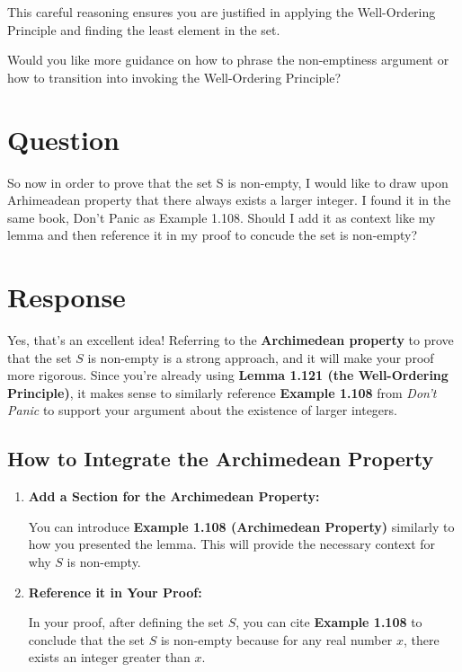 \documentclass{article}
\begin{document}
This careful reasoning ensures you are justified in applying the Well-Ordering Principle and finding the least element in the set.

Would you like more guidance on how to phrase the non-emptiness argument or how to transition into invoking the Well-Ordering Principle?

\section*{Question}

So now in order to prove that the set S is non-empty, I would like to draw upon Arhimeadean property that there always exists a larger integer. I found it in the same book, Don't Panic as Example 1.108. Should I add it as context like my lemma and then reference it in my proof to concude the set is non-empty?

\section*{Response}

Yes, that's an excellent idea! Referring to the \textbf{Archimedean property} to prove that the set \( S \) is non-empty is a strong approach, and it will make your proof more rigorous. Since you're already using \textbf{Lemma 1.121 (the Well-Ordering Principle)}, it makes sense to similarly reference \textbf{Example 1.108} from \emph{Don't Panic} to support your argument about the existence of larger integers.

\subsection*{How to Integrate the Archimedean Property}

\begin{enumerate}
    \item \textbf{Add a Section for the Archimedean Property:}
    
    You can introduce \textbf{Example 1.108 (Archimedean Property)} similarly to how you presented the lemma. This will provide the necessary context for why \( S \) is non-empty.
    
    \item \textbf{Reference it in Your Proof:}
    
    In your proof, after defining the set \( S \), you can cite \textbf{Example 1.108} to conclude that the set \( S \) is non-empty because for any real number \( x \), there exists an integer greater than \( x \).
\end{enumerate}
\end{document}
